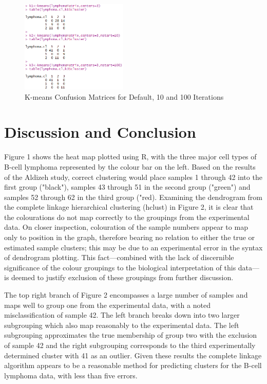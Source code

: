 \documentclass[11 pt,letterpaper,titlepage]{article} %
\begin{document}
    \begin{figure}[H]
        \centering
        \includegraphics[width=2in]{Figures/kmeans.png}
        \caption{K-means Confusion Matrices for Default, 10 and 100 Iterations}
        \label{fig:kmeans}
    \end{figure}

\section{Discussion and Conclusion}

    Figure 1 shows the heat map plotted using R, with the three major cell types of B-cell lymphoma represented by the colour bar on the left.
    Based on the results of the Aldizeh study, correct clustering would place samples 1 through 42 into the first group ("black"), samples 43 through 51 in the second group ("green") and samples 52 through 62 in the third group ("red).
    Examining the dendrogram from the complete linkage hierarchical clustering (hclust) in Figure 2, it is clear that the colourations do not map correctly to the groupings from the experimental data. 
    On closer inspection, colouration of the sample numbers appear to map only to position in the graph, therefore bearing no relation to either the true or estimated sample clusters; this may be due to an experimental error in the syntax of dendrogram plotting. 
    This fact---combined with the lack of discernible significance of the colour groupings to the biological interpretation of this data---is deemed to justify exclusion of these groupings from further discussion.

    The top right branch of Figure 2 encompasses a large number of samples and maps well to group one from the experimental data, with a noted misclassification of sample 42. The left branch breaks down into two larger subgrouping which also map reasonably to the experimental data. The left subgrouping approximates the true membership of group two with the exclusion of sample 42 and the right subgrouping corresponds to the third experimentally determined cluster with 41 as an outlier. Given these results the complete linkage algorithm appears to be a reasonable method for predicting clusters for the B-cell lymphoma data, with less than five errors.
\end{document}
